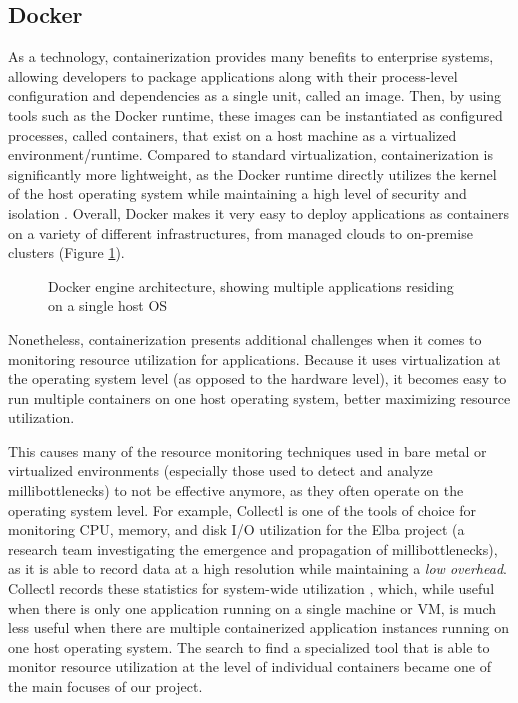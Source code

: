 \documentclass[a4paper,11pt]{article}
\newcommand{\overhead}{\textit{low overhead}\xspace}
\begin{document}
\vspace{-0.1em}
\subsection{Docker}

As a technology, containerization provides many benefits to enterprise systems,
allowing developers to package applications along with their process-level configuration and dependencies as a single unit,
called an image.
Then, by using tools such as the Docker runtime, these images can be instantiated as configured processes, called containers,
that exist on a host machine as a virtualized environment/runtime.
Compared to standard virtualization, containerization is significantly more lightweight,
as the Docker runtime directly utilizes the kernel of the host operating system
while maintaining a high level of security and isolation \cite{Docker-Overview}.
Overall, Docker makes it very easy to deploy applications as containers on a variety of different infrastructures,
from managed clouds to on-premise clusters (Figure \ref{fig:docker_stack}).

\setlength\intextsep{-0.3em}
\begin{figure}
    \scalebox{}{}
    \begin{addmargin}[0.5em]{0em}
        \resizebox{\linewidth}{!}{}
        \vspace{-0.25em}
        \caption{Docker engine architecture, showing multiple applications residing on a single host OS}
        \label{fig:docker_stack}
    \end{addmargin}
    \vspace{1.2em}
\end{figure}

Nonetheless, containerization presents additional challenges when it comes to monitoring resource utilization for applications.
Because it uses virtualization at the operating system level (as opposed to the hardware level),
it becomes easy to run multiple containers on one host operating system,
better maximizing resource utilization.

This causes many of the resource monitoring techniques used in bare metal or virtualized environments
(especially those used to detect and analyze millibottlenecks)
to not be effective anymore, as they often operate on the operating system level.
For example, Collectl is one of the tools of choice for monitoring CPU, memory, and disk I/O utilization
for the Elba project \cite{ElbaRodrigo} (a research team investigating the emergence and propagation of millibottlenecks),
as it is able to record data at a high resolution while maintaining a \overhead.
Collectl records these statistics for system-wide utilization \cite{Collectl},
which, while useful when there is only one application running on a single machine or VM,
is much less useful when there are multiple containerized application instances running on one host operating system.
The search to find a specialized tool that is able to monitor resource utilization
at the level of individual containers became one of the main focuses of our project.
\end{document}
